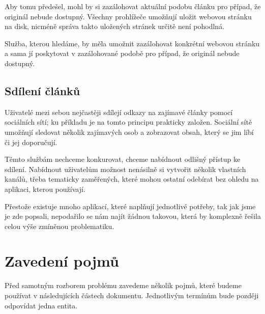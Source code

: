 Aby tomu předešel, mohl by si zazálohovat aktuální podobu článku pro případ, že originál nebude dostupný.
Všechny prohlížeče umožňují uložit webovou stránku na disk, nicméně správa takto uložených stránek určitě není pohodlná.

Služba, kterou hledáme, by měla umožnit zazálohovat konkrétní webovou stránku a sama jí poskytovat v zazálohované podobě pro případ, že originál nebude dostupný.

\subsection{Sdílení článků}

Uživatelé mezi sebou nejčastěji sdílejí odkazy na zajímavé články pomocí sociálních sítí; ku příkladu  je na tomto principu prakticky založen.
Sociální sítě umožňují sledovat několik zajímavých osob a zobrazovat obsah, který se jim líbí či jej doporučují.

Těmto službám nechceme konkurovat, chceme nabídnout odlišný přístup ke sdílení.
Nabídnout uživatelům možnost nenásilně si vytvořit několik vlastních kanálů, třeba tematicky zaměřených, které mohou ostatní odebírat bez ohledu na aplikaci, kterou používají.

\bigskip

Přestože existuje mnoho aplikací, které naplňují jednotlivé potřeby, tak jak jsme je zde popsali, nepodařilo se nám najít žádnou takovou, která by komplexně řešila celou výše zmíněnou problematiku.

\section{Zavedení pojmů}

Před samotným rozborem problému zavedeme několik pojmů, které budeme používat v následujících částech dokumentu.
Jednotlivým termínům bude později odpovídat jedna entita.

